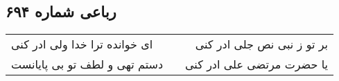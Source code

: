 \begin{center}
\section*{رباعی شماره ۶۹۴}
\label{sec:sh694}
\begin{longtable}{l p{0.5cm} r}
ای خوانده ترا خدا ولی ادر کنی
&&
بر تو ز نبی نص جلی ادر کنی
\\
دستم تهی و لطف تو بی پایانست
&&
یا حضرت مرتضی علی ادر کنی
\\
\end{longtable}
\end{center}
